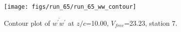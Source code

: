 \begin{figure}[H]
\centering
\texttt{[image: figs/run\_65/run\_65\_ww\_contour]}
\caption{Contour plot of $\overline{w^\prime w^\prime}$ at $z/c$=10.00, $V_{free}$=23.23, station 7.}
\end{figure}


